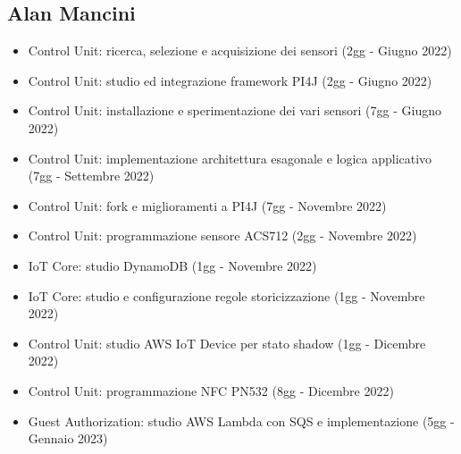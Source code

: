 \subsection{Alan Mancini}
\begin{itemize}
    \item Control Unit: ricerca, selezione e acquisizione dei sensori (2gg - Giugno 2022)
    \item Control Unit: studio ed integrazione framework PI4J (2gg - Giugno 2022) 
    \item Control Unit: installazione e sperimentazione dei vari sensori (7gg - Giugno 2022)
    \item Control Unit: implementazione architettura esagonale e logica applicativo (7gg - Settembre 2022)
    \item Control Unit: fork e miglioramenti a PI4J (7gg - Novembre 2022)
    \item Control Unit: programmazione sensore ACS712 (2gg - Novembre 2022)
    \item IoT Core: studio DynamoDB (1gg - Novembre 2022)
    \item IoT Core: studio e configurazione regole storicizzazione (1gg - Novembre 2022)
    \item Control Unit: studio AWS IoT Device per stato shadow (1gg - Dicembre 2022)
    \item Control Unit: programmazione NFC PN532 (8gg - Dicembre 2022)
    \item Guest Authorization: studio AWS Lambda con SQS e implementazione (5gg - Gennaio 2023)
\end{itemize}

